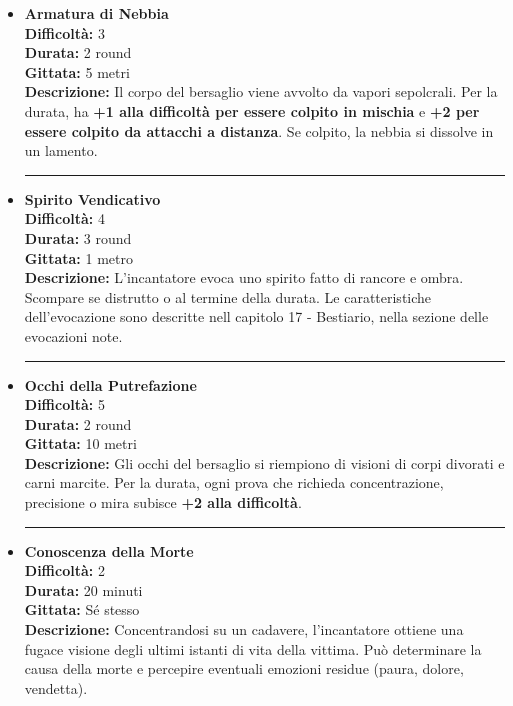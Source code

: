 \documentclass[./magie.tex]{subfiles}
\begin{document}
\begin{itemize}

\item \textbf{Armatura di Nebbia} \\
\textbf{Difficoltà:} 3 \\
\textbf{Durata:} 2 round \\
\textbf{Gittata:} 5 metri \\
\textbf{Descrizione:} Il corpo del bersaglio viene avvolto da vapori sepolcrali. Per la durata, ha \textbf{+1 alla difficoltà per essere colpito in mischia} e \textbf{+2 per essere colpito da attacchi a distanza}. Se colpito, la nebbia si dissolve in un lamento.

\vspace{0.5cm}\rule{\textwidth}{0.4pt}\vspace{1cm}

\item \textbf{Spirito Vendicativo} \\
\textbf{Difficoltà:} 4 \\
\textbf{Durata:} 3 round \\
\textbf{Gittata:} 1 metro \\
\textbf{Descrizione:} L'incantatore evoca uno spirito fatto di rancore e ombra. Scompare se distrutto o al termine della durata. Le caratteristiche dell'evocazione sono descritte nell capitolo 17 - Bestiario, nella sezione delle evocazioni note.

\vspace{0.5cm}\rule{\textwidth}{0.4pt}\vspace{1cm}

\item \textbf{Occhi della Putrefazione} \\
\textbf{Difficoltà:} 5 \\
\textbf{Durata:} 2 round \\
\textbf{Gittata:} 10 metri \\
\textbf{Descrizione:} Gli occhi del bersaglio si riempiono di visioni di corpi divorati e carni marcite. Per la durata, ogni prova che richieda concentrazione, precisione o mira subisce \textbf{+2 alla difficoltà}.

\vspace{0.5cm}\rule{\textwidth}{0.4pt}\vspace{1cm}

\item \textbf{Conoscenza della Morte} \\
\textbf{Difficoltà:} 2 \\
\textbf{Durata:} 20 minuti \\
\textbf{Gittata:} Sé stesso \\
\textbf{Descrizione:} Concentrandosi su un cadavere, l'incantatore ottiene una fugace visione degli ultimi istanti di vita della vittima. Può determinare la causa della morte e percepire eventuali emozioni residue (paura, dolore, vendetta).

\end{itemize}
\end{document}
